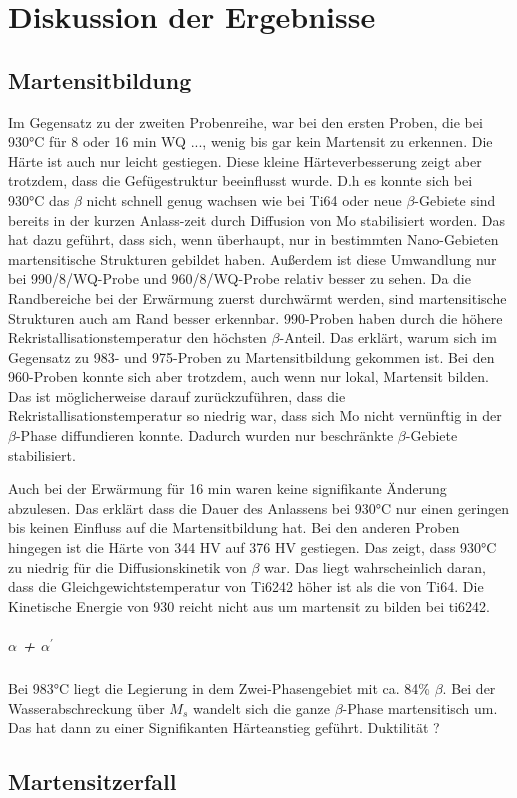 \chapter{Diskussion der Ergebnisse}

\section{Martensitbildung}


Im Gegensatz zu der zweiten Probenreihe, war  bei den ersten Proben, die bei 930°C für 8   oder 16 min WQ ..., wenig bis gar kein Martensit zu erkennen. Die Härte ist auch nur leicht gestiegen. Diese kleine Härteverbesserung zeigt aber trotzdem, dass  die Gefügestruktur  beeinflusst wurde. D.h es konnte sich bei 930°C das $\beta$ nicht schnell genug wachsen wie bei Ti64 oder neue $\beta$-Gebiete sind bereits in der kurzen Anlass-zeit  durch Diffusion von Mo stabilisiert worden. 
Das hat dazu geführt, dass sich, wenn überhaupt, nur in bestimmten Nano-Gebieten martensitische Strukturen gebildet haben. Außerdem ist diese Umwandlung nur bei  990/8/WQ-Probe und 960/8/WQ-Probe relativ besser zu sehen. Da die Randbereiche bei der Erwärmung zuerst durchwärmt werden, sind martensitische Strukturen auch am Rand besser erkennbar.
990-Proben haben durch die höhere Rekristallisationstemperatur den höchsten $\beta$-Anteil. Das erklärt, warum sich im Gegensatz zu 983- und 975-Proben zu Martensitbildung gekommen ist.
Bei den 960-Proben konnte sich aber trotzdem, auch wenn nur  lokal, Martensit bilden. Das ist möglicherweise darauf zurückzuführen, dass die Rekristallisationstemperatur  so niedrig war, dass sich Mo nicht vernünftig  in der $\beta$-Phase diffundieren konnte. Dadurch wurden nur beschränkte $\beta$-Gebiete stabilisiert.

Auch bei der Erwärmung für 16 min waren keine signifikante Änderung abzulesen. Das erklärt dass die Dauer des Anlassens bei 930°C nur einen geringen bis keinen Einfluss auf die Martensitbildung hat. 
Bei den anderen Proben hingegen ist die Härte von 344 HV auf 376 HV gestiegen. 
Das zeigt, dass 930°C zu niedrig  für die Diffusionskinetik von $\beta$ war. Das liegt wahrscheinlich daran, dass die Gleichgewichtstemperatur von Ti6242 höher ist als die von Ti64. Die Kinetische Energie von 930 reicht nicht aus um martensit zu bilden bei ti6242.

\paragraph{$\alpha$ + $\alpha^\prime$}

Bei 983°C  liegt die Legierung in dem  Zwei-Phasengebiet mit ca. 84\% $\beta$. Bei der Wasserabschreckung über $M_s$ wandelt sich die ganze $\beta$-Phase martensitisch um. Das hat dann zu einer Signifikanten Härteanstieg geführt. Duktilität ?


\section{Martensitzerfall}
